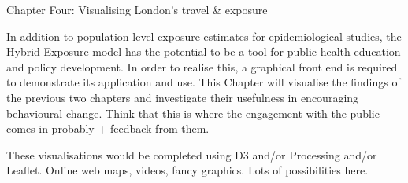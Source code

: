 Chapter Four: Visualising London’s travel & exposure

In addition to population level exposure estimates for epidemiological studies, the Hybrid Exposure model has the potential to be a tool for public health education and policy development. In order to realise this, a graphical front end is required to demonstrate its application and use. This Chapter will visualise the findings of the previous two chapters and investigate their usefulness in encouraging behavioural change. Think that this is where the engagement with the public comes in probably + feedback from them.

These visualisations would be completed using D3 and/or Processing and/or Leaflet. Online web maps, videos, fancy graphics. Lots of possibilities here.
